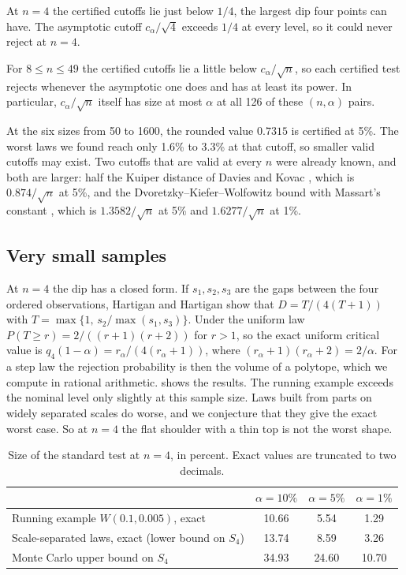 At $n=4$ the certified cutoffs lie just below $1/4$, the largest dip four points can have. The asymptotic cutoff $c_\alpha/\sqrt4$ exceeds $1/4$ at every level, so it could never reject at $n=4$.

For $8\le n\le49$ the certified cutoffs lie a little below $c_\alpha/\sqrt n$, so each certified test rejects whenever the asymptotic one does and has at least its power. In particular, $c_\alpha/\sqrt n$ itself has size at most $\alpha$ at all 126 of these $(n,\alpha)$ pairs.

At the six sizes from 50 to 1600, the rounded value $0.7315$ is certified at 5\%. The worst laws we found reach only 1.6\% to 3.3\% at that cutoff, so smaller valid cutoffs may exist. Two cutoffs that are valid at every $n$ were already known, and both are larger: half the Kuiper distance of Davies and Kovac \cite{DK04}, which is $0.874/\sqrt n$ at 5\%, and the Dvoretzky--Kiefer--Wolfowitz bound with Massart's constant \cite{Massart90}, which is $1.3582/\sqrt n$ at 5\% and $1.6277/\sqrt n$ at 1\%.

\subsection{Very small samples}
At $n=4$ the dip has a closed form. If $s_1,s_2,s_3$ are the gaps between the four ordered observations, Hartigan and Hartigan \cite[p.~73]{HH85} show that $D=T/(4(T+1))$ with $T=\max\{1,\,s_2/\max(s_1,s_3)\}$. Under the uniform law $P(T\ge r)=2/((r+1)(r+2))$ for $r>1$, so the exact uniform critical value is $q_4(1-\alpha)=r_\alpha/(4(r_\alpha+1))$, where $(r_\alpha+1)(r_\alpha+2)=2/\alpha$. For a step law the rejection probability is then the volume of a polytope, which we compute in rational arithmetic.  shows the results. The running example exceeds the nominal level only slightly at this sample size. Laws built from parts on widely separated scales do worse, and we conjecture that they give the exact worst case. So at $n=4$ the flat shoulder with a thin top is not the worst shape.

\begin{table}[t]
\centering
\small
\caption{Size of the standard test at $n=4$, in percent. Exact values are truncated to two decimals.}
\label{tab:n4}
\begin{tabular}{lccc}
\toprule
 & $\alpha=10\%$ & $\alpha=5\%$ & $\alpha=1\%$ \\
\midrule
Running example $W(0.1,0.005)$, exact & 10.66 & 5.54 & 1.29 \\
Scale-separated laws, exact (lower bound on $S_4$) & 13.74 & 8.59 & 3.26 \\
Monte Carlo upper bound on $S_4$ & 34.93 & 24.60 & 10.70 \\
\bottomrule
\end{tabular}
\end{table}

